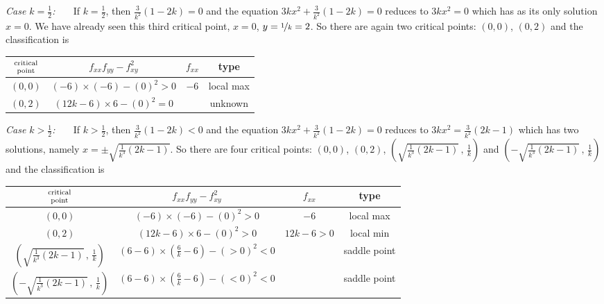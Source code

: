 \begin{solution}
\emph{Case $k=\frac{1}{2}$:\ \ \ }
If $k=\frac{1}{2}$, then $\frac{3}{k^2}(1-2k)=0$ and the equation 
$3kx^2+\frac{3}{k^2}(1-2k)=0$ reduces to $3kx^2=0$ which has as its only solution $x=0$. We have already seen this third critical point, $x=0$, $y=\nicefrac{1}{k}=2$. 
So there are again two critical points: $(0,0)$, $(0,2)$ and 
the classification is
\begin{center}
\renewcommand{\arraystretch}{1.3}
     \begin{tabular}{|c|c|c|c|}
     \hline
    $\Atop{\text{critical}}{\text{point}}$  & $f_{xx}f_{yy}-f_{xy}^2$ & 
                                                          $f_{xx}$ & type \\    
    \hline
     $(0,0)$  & $(-6)\times(-6)-(0)^2> 0$ & $-6$   & local max  \\ \hline
     $(0,2)$  & $(12k-6)\times 6-(0)^2=0$ &   & unknown \\  \hline
     \end{tabular}
\renewcommand{\arraystretch}{1.0}
\end{center}

\emph{Case $k>\frac{1}{2}$:\ \ \ }
If $k>\frac{1}{2}$, then $\frac{3}{k^2}(1-2k)<0$ and the equation 
$3kx^2+\frac{3}{k^2}(1-2k)=0$ reduces to $3kx^2=\frac{3}{k^2}(2k-1)$ 
which has two solutions, namely $x=\pm\sqrt{\frac{1}{k^3}(2k-1)}$.  
So there are four critical points: $(0,0)$, $(0,2)$,
$\left(\sqrt{\frac{1}{k^3}(2k-1)}\,,\,\frac{1}{k}\right)$ and 
$\left(-\sqrt{\frac{1}{k^3}(2k-1)}\,,\,\frac{1}{k}\right)$ and 
the classification is
\begin{center}
\renewcommand{\arraystretch}{1.3}
     \begin{tabular}{|c|c|c|c|}
     \hline
    $\Atop{\text{critical}}{\text{point}}$  & $f_{xx}f_{yy}-f_{xy}^2$ & 
                                                          $f_{xx}$ & type \\    
    \hline
     $(0,0)$  & $(-6)\times(-6)-(0)^2> 0$ & $-6$   & local max  \\ \hline
     $(0,2)$  & $(12k-6)\times 6-(0)^2>0$ & $12k-6>0$ & local min \\  \hline
     $\left(\sqrt{\frac{1}{k^3}(2k-1)}\,,\,\frac{1}{k}\right)$  
               & $(6-6)\times (\frac{6}{k}-6)-(> 0)^2<0$ &   & saddle point \\  \hline
     $\left(-\sqrt{\frac{1}{k^3}(2k-1)}\,,\,\frac{1}{k}\right)$  
               & $(6-6)\times (\frac{6}{k}-6)-(< 0)^2<0$ &   & saddle point \\  \hline
     \end{tabular}
\renewcommand{\arraystretch}{1.0}
\end{center}
\end{solution}

